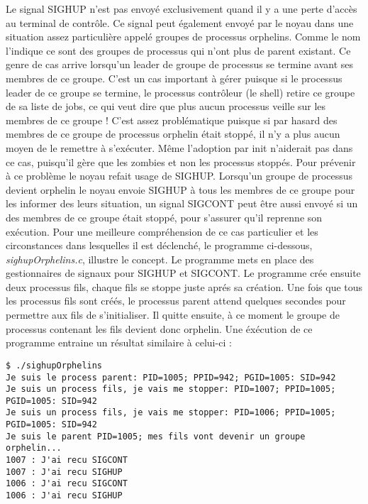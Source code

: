 Le signal SIGHUP n’est pas envoyé exclusivement quand il y a une perte d’accès au terminal de contrôle. Ce signal peut également envoyé par le noyau dans une situation assez particulière appelé groupes 
de processus orphelins. Comme le nom l’indique ce sont des groupes de processus qui n’ont plus de parent existant. Ce genre de cas arrive lorsqu’un leader de groupe de processus se termine avant ses membres de 
ce groupe. 
\newline
C’est un cas important à gérer puisque si le processus leader de ce groupe se termine, le processus contrôleur (le shell) retire ce groupe de sa liste de jobs, ce qui veut dire que plus aucun processus veille 
sur les membres de ce groupe ! C’est assez problématique puisque si par hasard des membres de ce groupe de processus orphelin était stoppé, il n’y a plus aucun moyen de le remettre à s’exécuter. Même l’adoption par 
init n’aiderait pas dans ce cas, puisqu’il gère que les zombies et non les processus stoppés.
\newline
Pour prévenir à ce problème le noyau refait usage de SIGHUP. Lorsqu’un groupe de processus devient orphelin le noyau envoie SIGHUP à tous les membres de ce groupe pour les informer des leurs situation, un signal 
SIGCONT peut être aussi envoyé si un des membres de ce groupe était stoppé, pour s’assurer qu’il reprenne son exécution. 
\newline
\newline
Pour une meilleure compréhension de ce cas particulier et les circonstances dans lesquelles il est déclenché, le programme ci-dessous, \textit{sighupOrphelins.c}, illustre le concept.
Le programme mets en place des gestionnaires de signaux pour SIGHUP et SIGCONT. Le programme crée ensuite deux processus fils, chaque fils se stoppe juste aprés sa création.
\newline
Une fois que tous les processus fils sont créés, le processus parent attend quelques secondes pour permettre aux fils de s'initialiser. Il quitte ensuite, à ce moment le groupe de processus contenant les fils devient donc orphelin. 
\newline
Une éxécution de ce programme entraine un résultat similaire à celui-ci :
\begin{lstlisting}[style=blackstyle]
$ ./sighupOrphelins
Je suis le process parent: PID=1005; PPID=942; PGID=1005: SID=942
Je suis un process fils, je vais me stopper: PID=1007; PPID=1005; PGID=1005: SID=942
Je suis un process fils, je vais me stopper: PID=1006; PPID=1005; PGID=1005: SID=942
Je suis le parent PID=1005; mes fils vont devenir un groupe orphelin...
1007 : J'ai recu SIGCONT
1007 : J'ai recu SIGHUP
1006 : J'ai recu SIGCONT
1006 : J'ai recu SIGHUP
\end{lstlisting}


